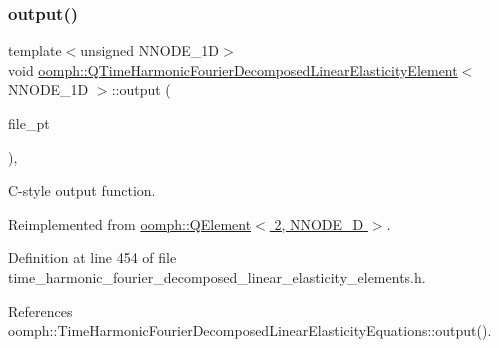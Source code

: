 \subsubsection{\texorpdfstring{output()}{output()}\hspace{0.1cm}{\footnotesize\ttfamily [3/4]}}
{\footnotesize\ttfamily template$<$unsigned N\+N\+O\+D\+E\+\_\+1D$>$ \\
void \hyperlink{classoomph_1_1QTimeHarmonicFourierDecomposedLinearElasticityElement}{oomph\+::\+Q\+Time\+Harmonic\+Fourier\+Decomposed\+Linear\+Elasticity\+Element}$<$ N\+N\+O\+D\+E\+\_\+1D $>$\+::output (\begin{DoxyParamCaption}\item[{F\+I\+LE $\ast$}]{file\+\_\+pt }\end{DoxyParamCaption})\hspace{0.3cm}{\ttfamily [inline]}, {\ttfamily [virtual]}}



C-\/style output function. 



Reimplemented from \hyperlink{classoomph_1_1QElement_3_012_00_01NNODE__1D_01_4_a08e9ce84ba8787b25935f18c00996a5d}{oomph\+::\+Q\+Element$<$ 2, N\+N\+O\+D\+E\+\_\+D $>$}.



Definition at line 454 of file time\+\_\+harmonic\+\_\+fourier\+\_\+decomposed\+\_\+linear\+\_\+elasticity\+\_\+elements.\+h.



References oomph\+::\+Time\+Harmonic\+Fourier\+Decomposed\+Linear\+Elasticity\+Equations\+::output().

\mbox{\label{classoomph_1_1QTimeHarmonicFourierDecomposedLinearElasticityElement_aa965a2e2d7f942f43e5e668b9111e9e0}} 
